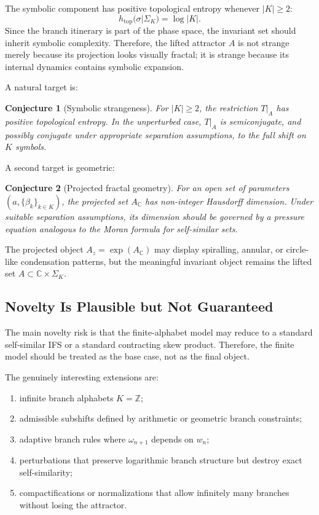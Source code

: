 \documentclass[12pt]{article}
\newtheorem{conjecture}{Conjecture}
\newcommand{\C}{\mathbb{C}}
\newcommand{\Z}{\mathbb{Z}}
\newcommand{\shift}{\sigma}
\newcommand{\HTop}{h_{\mathrm{top}}}
\begin{document}
	The symbolic component has positive topological entropy whenever \(|K|\geq 2\):
	\[
	\HTop(\shift|\Sigma_K)=\log |K|.
	\]
	Since the branch itinerary is part of the phase space, the invariant set should inherit symbolic complexity. Therefore, the lifted attractor \(A\) is not strange merely because its projection looks visually fractal; it is strange because its internal dynamics contains symbolic expansion.
	
	A natural target is:
	
	\begin{conjecture}[Symbolic strangeness]
		For \(|K|\geq 2\), the restriction \(T|_A\) has positive topological entropy. In the unperturbed case, \(T|_A\) is semiconjugate, and possibly conjugate under appropriate separation assumptions, to the full shift on \(K\) symbols.
	\end{conjecture}
	
	A second target is geometric:
	
	\begin{conjecture}[Projected fractal geometry]
		For an open set of parameters \((a,\{\beta_k\}_{k\in K})\), the projected set \(A_{\C}\) has non-integer Hausdorff dimension. Under suitable separation assumptions, its dimension should be governed by a pressure equation analogous to the Moran formula for self-similar sets.
	\end{conjecture}
	
	The projected object \(A_z=\exp(A_{\C})\) may display spiralling, annular, or circle-like condensation patterns, but the meaningful invariant object remains the lifted set \(A\subset \C\times\Sigma_K\).
	
	\subsection{Novelty Is Plausible but Not Guaranteed}
	
	The main novelty risk is that the finite-alphabet model may reduce to a standard self-similar IFS or a standard contracting skew product. Therefore, the finite model should be treated as the base case, not as the final object.
	
	The genuinely interesting extensions are:
	
	\begin{enumerate}
		\item infinite branch alphabets \(K=\Z\);
		\item admissible subshifts defined by arithmetic or geometric branch constraints;
		\item adaptive branch rules where \(\omega_{n+1}\) depends on \(w_n\);
		\item perturbations that preserve logarithmic branch structure but destroy exact self-similarity;
		\item compactifications or normalizations that allow infinitely many branches without losing the attractor.
	\end{enumerate}
	
\end{document}
